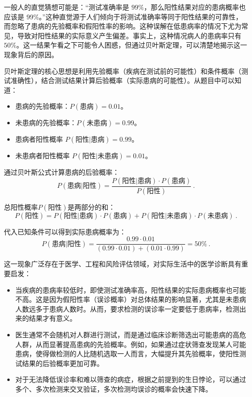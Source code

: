 一般人的直觉猜想可能是：“测试准确率是 $99\%$，那么阳性结果对应的患病概率也应该是 $99\%$。”这种直觉源于人们倾向于将测试准确率等同于阳性结果的可靠性，而忽略了患病的先验概率和假阳性率的影响。这种误解在低患病率的情况下尤为常见，导致对阳性结果的实际意义产生偏差。事实上，这种情况病人的患病率只有$50\%$。这一结果乍看之下可能令人困惑，但通过贝叶斯定理，可以清楚地揭示这一现象背后的原因。

贝叶斯定理的核心思想是利用先验概率（疾病在测试前的可能性）和条件概率（测试准确性），结合测试结果计算后验概率（实际患病的可能性）。从题目中可以知道：

\begin{itemize}
\item 患病的先验概率：$P(\text{患病}) = 0.01$。
\item 未患病的先验概率：$P(\text{未患病}) = 0.99$。
\item 患病者阳性概率 $P(\text{阳性}|\text{患病}) = 0.99$。
\item 未患病者阳性概率 $P(\text{阳性}|\text{未患病}) = 0.01$。
\end{itemize}

通过贝叶斯公式计算患病的后验概率：
\begin{equation}
P(\text{患病}|\text{阳性}) = \frac{P(\text{阳性}|\text{患病}) \cdot P(\text{患病})}{P(\text{阳性})}~.
\end{equation}

总阳性概率$P(\text{阳性})$是两部分的和：
\begin{equation}
P(\text{阳性}) = P(\text{阳性}|\text{患病}) \cdot P(\text{患病}) + P(\text{阳性}|\text{未患病}) \cdot P(\text{未患病})~.
\end{equation}

代入已知条件可以得到实际患病概率为：
\begin{equation}
P(\text{患病}|\text{阳性}) = \frac{0.99 \cdot 0.01}{(0.99 \cdot 0.01) + (0.01 \cdot 0.99)}= 50\%~.
\end{equation}

这一现象广泛存在于医学、工程和风险评估领域，对实际生活中的医学诊断具有重要启发：
\begin{itemize}
\item 当疾病的患病率较低时，即使测试准确率高，阳性结果的实际患病概率也可能不高。这是因为假阳性率（误诊概率）对总体结果的影响显著，尤其是未患病人数远多于患病人数时。从而，要求检测的误诊率一定要低于患病率，检测出来的结果才有意义。
\item 医生通常不会随机对人群进行测试，而是通过临床诊断筛选出可能患病的高危人群，从而显著提高患病的先验概率。例如，如果通过症状筛查发现某人可能患病，使得做检测的人比随机选取一人而言，大幅提升其先验概率，使阳性测试结果的后验概率更加可靠。
\item 对于无法降低误诊率和难以筛查的病症，根据之前提到的生日悖论，可以通过多个、多次检测来交叉验证，多次检测均误诊的概率会快速下降。
\end{itemize}
